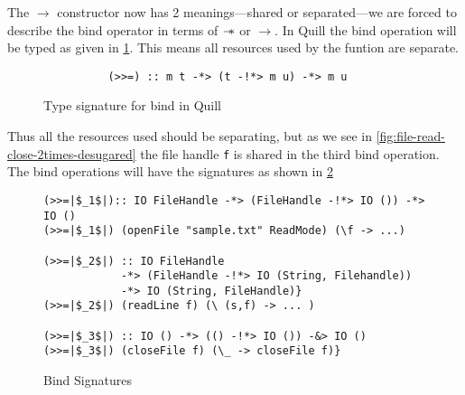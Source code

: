 The $\rightarrow$ constructor now has 2 meanings---shared or separated---we are
forced to describe the bind operator in terms of $\mathrel{-\mkern-6mu*}$ or $\rightarrow$. In Quill the bind operation will
be typed as given in \cref{fig:quill-bind-type}. This means all resources used by the funtion are separate.
\begin{figure}[h]
  \begin{framed}
    \begin{verbatim}
          (>>=) :: m t -*> (t -!*> m u) -*> m u
    \end{verbatim}
  \end{framed}
  \caption{Type signature for bind in Quill}
  \label{fig:quill-bind-type}
\end{figure}
Thus all the resources used should be separating, but as we see in \cref{fig:file-read-close-2times-desugared} the file handle
\texttt{f} is shared in the third bind operation.
The bind operations will have the signatures as shown in \cref{fig:bind-signatures}
\begin{figure}[h]
\begin{framed}
\begin{verbatim}
(>>=|$_1$|):: IO FileHandle -*> (FileHandle -!*> IO ()) -*> IO ()
(>>=|$_1$|) (openFile "sample.txt" ReadMode) (\f -> ...)

(>>=|$_2$|) :: IO FileHandle
            -*> (FileHandle -!*> IO (String, Filehandle))
            -*> IO (String, FileHandle)}
(>>=|$_2$|) (readLine f) (\ (s,f) -> ... )

(>>=|$_3$|) :: IO () -*> (() -!*> IO ()) -&> IO ()
(>>=|$_3$|) (closeFile f) (\_ -> closeFile f)}
\end{verbatim}
\end{framed}
\caption{Bind Signatures}
\label{fig:bind-signatures}
\end{figure}

